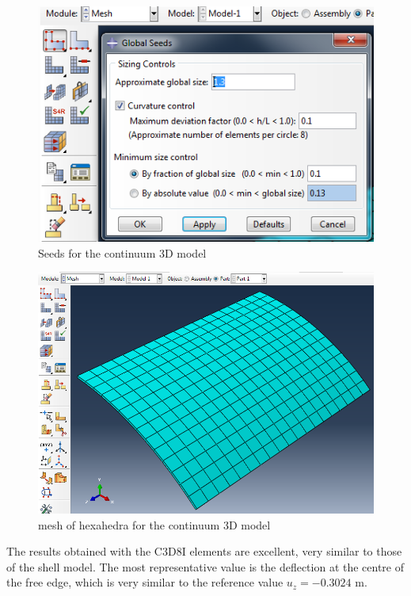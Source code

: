 \documentclass[english,a4paper,12pt]{article}
\begin{document}
\begin{figure}[htp]
\centering
\includegraphics[scale=0.5]{capturas/44-mesh-solid.png}
\caption{Seeds for the continuum 3D model}
\label{fig:mesh-s-solid}
\end{figure}
\begin{figure}[htb]
\centering
\includegraphics[scale=0.45]{capturas/45-mesh-solid.png}
\caption{mesh of hexahedra for the continuum 3D model}
\label{fig:mesh-m-solid}
\end{figure}

The results obtained with the C3D8I elements are excellent, very similar to those of the shell model.
The most representative value is the deflection at the centre of the free edge, which is very similar to the reference value $u_{z}=-0.3024$ m.
\end{document}
